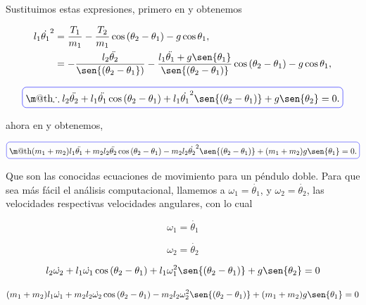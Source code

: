 \documentclass[a4paper,10pt]{article}
\makeatletter
\numberwithin{equation}{section}
\newcommand*{\boxcolor}{blue}
\renewcommand{\boxed}[1]{\textcolor{\boxcolor}{%
\tikz[baseline={([yshift=-1ex]current bounding box.center)}] \node [rectangle, minimum width=1ex,rounded corners,draw] {\normalcolor\m@th$\displaystyle#1$};}}
\makeatother
\begin{document}
Sustituimos estas expresiones, primero en  y obtenemos 

\begin{align*}
 l_1 \dot{\theta_1}^2 &= \frac{T_1}{m_1} - \frac{T_2}{m_1}\cos{(\theta_2 - \theta_1)} - g \cos{\theta_1}, \\
		      &= - \frac{l_2\ddot{\theta_2}}{\sen{(\theta_2 - \theta_1})}
		         -   \frac{l_1 \ddot{\theta_1} + g \sen{\theta_1}}{\sen{(\theta_2 - \theta_1)}}\cos{(\theta_2 - \theta_1)}
		         - g \cos{\theta_1},
\end{align*}

\begin{equation}
 \boxed{\therefore l_2 \ddot{\theta_2} + l_1 \ddot{\theta_1}\cos{(\theta_2 - \theta_1)} 
 + l_1 \dot{\theta_1}^2\sen{(\theta_2 - \theta_1)} + g \sen{\theta_2} = 0.}
\end{equation}

ahora en  y obtenemos,

\begin{equation}
 \boxed{(m_1 + m_2) l_1 \ddot{\theta_1} + m_2 l_2 \ddot{\theta_2}\cos{(\theta_2 - \theta_1)}
 - m_2 l_2 \dot{\theta_2}^2 \sen{(\theta_2 - \theta_1)} + (m_1 + m_2)g\sen{\theta_1} = 0.}
\end{equation}

\vspace{.3cm}

Que son las conocidas ecuaciones de movimiento para un péndulo doble. Para que sea más
fácil el análisis computacional, llamemos a $\omega_1 = \dot{\theta_1}$, y 
$\omega_2 = \dot{\theta_2}$, las velocidades respectivas velocidades angulares,
con lo cual

\begin{equation}
 \omega_1 = \dot{\theta_1}
 \label{eq:pendu11}
\end{equation}

\begin{equation}
 \omega_2 = \dot{\theta_2}
 \label{eq:pendu12}
\end{equation}

\begin{equation}
 l_2 \dot{\omega_2} + l_1 \dot{\omega_1} \cos{(\theta_2 - \theta_1)} + l_1 \omega_1^2
 \sen{(\theta_2 - \theta_1)} + g \sen{\theta_2} = 0
 \label{eq:pendu13}
\end{equation}

\begin{equation}
 (m_1 + m_2)l_1 \dot{\omega_1} + m_2 l_2 \dot{\omega_2} \cos{(\theta_2 - \theta_1)}
 - m_2 l_2 \omega_2^2 \sen{(\theta_2 - \theta_1)} + (m_1 + m_2)g\sen{\theta_1} = 0 
 \label{eq:pendu14}
\end{equation}
\end{document}
